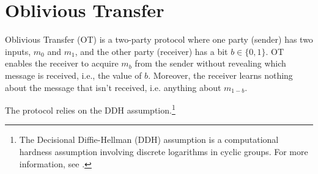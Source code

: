 \section{Oblivious Transfer}
Oblivious Transfer (OT) is a two-party protocol where one party (sender) has two inputs, $m_0$ and $m_1$, and the other party (receiver) has a bit $b \in \{0,1\}$. 
OT enables the receiver to acquire $m_b$ from the sender without revealing which message is received, i.e., the value of $b$.
Moreover, the receiver learns nothing about the message that isn't received, i.e. anything about $m_{1-b}$.

The protocol relies on the DDH assumption.\footnote{The Decisional Diffie-Hellman (DDH) assumption is a computational hardness assumption involving discrete logarithms in cyclic groups. For more information, see \cite{Boneh1998}.}


